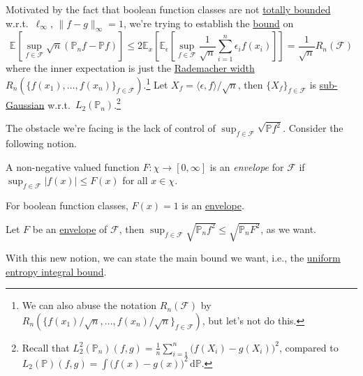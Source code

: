 \begin{prev}
	Motivated by the fact that boolean function classes are not \hyperref[def:totally-bounded]{totally bounded} w.r.t.\ \(\ell _\infty \), \(\lVert f - g \rVert _\infty = 1\), we're trying to establish the \hyperref[int:main-bound]{bound} on
	\[
		\mathbb{E}_{}\left[\sup _{f\in \mathscr{F} } \sqrt{n} (\mathbb{P} _n f - \mathbb{P} f) \right]
		\leq 2 \mathbb{E}_{x}\left[\mathbb{E}_{\epsilon }\left[\sup _{f\in \mathscr{F} } \frac{1}{\sqrt{n} } \sum_{i=1}^{n} \epsilon _i f(x_i) \right]  \right]
		= \frac{1}{\sqrt{n} } R_n(\mathscr{F} )
	\]
	where the inner expectation is just the \hyperref[def:Rademacher-width]{Rademacher width} \(R_n (\{ f(x_1), \dots , f(x_n)\}_{f\in \mathscr{F} } )\).\footnote{We can also abuse the notation \(R_n(\mathscr{F} )\) by \(R_n (\{ f(x_1) / \sqrt{n} , \dots , f(x_n) / \sqrt{n} \}_{f\in \mathscr{F} } )\), but let's not do this.} Let \(X_f = \langle \epsilon , f \rangle / \sqrt{n} \), then \(\{ X_f \} _{f\in \mathscr{F} }\) is \hyperref[def:sub-Gaussian-process]{sub-Gaussian} w.r.t.\ \(L_2(\mathbb{P} _n)\).\footnote{Recall that \(L_2^2(\mathbb{P} _n)(f, g) = \frac{1}{n}\sum_{i=1}^{n} \big(f(X_i) - g(X_i)\big)^2\), compared to \(L_2(\mathbb{P} )(f, g) = \int \big(f(x) - g(x)\big)^2 \,\mathrm{d} \mathbb{P} \).}
\end{prev}

The obstacle we're facing is the lack of control of \(\sup _{f\in \mathscr{F} } \sqrt{\mathbb{P} f^2} \). Consider the following notion.

\begin{definition}[Envelope]\label{def:envelope}
	A non-negative valued function \(F\colon \chi \to [0, \infty ]\) is an \emph{envelope} for \(\mathscr{F} \) if \(\sup _{f\in\mathscr{F} } \vert f(x) \vert \leq F(x)\) for all \(x\in \chi \).
\end{definition}

\begin{eg}
	For boolean function classes, \(F(x) = 1\) is an \hyperref[def:envelope]{envelope}.
\end{eg}

\begin{remark}
	Let \(F\) be an \hyperref[def:envelope]{envelope} of \(\mathscr{F} \), then \(\sup _{f\in \mathscr{F} }\sqrt{\mathbb{P} _n f^2} \leq \sqrt{\mathbb{P} _n F^2} \), as we want.
\end{remark}

With this new notion, we can state the main bound we want, i.e., the \hyperref[thm:uniform-entropy-integral-bound]{uniform entropy integral bound}.

